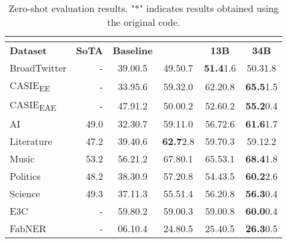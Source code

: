 \documentclass{article} \usepackage{iclr2024_conference,times}
\newcommand{\GoLLIE}{\scalerel*{\texttt{[image: logo/GoLLIE.pdf]}}{\textrm{\textbigcircle}} }
\begin{document}
\begin{table}
    \centering
    \caption{Zero-shot evaluation results. "*" indicates results obtained using the original code.}
\begin{tabular}{l|r|cc|cc}
            \multicolumn{6}{c}{} \\
            \toprule
            \textbf{Dataset} & \textbf{SoTA} & \textbf{Baseline} & \textbf{\GoLLIE} & \textbf{\GoLLIE 13B} & \textbf{\GoLLIE 34B} \\
            \midrule
            BroadTwitter & - & 39.0\tiny{0.5} & 49.5\tiny{0.7} & \textbf{51.4}\tiny{1.6} & 50.3\tiny{1.8} \\
            
            CASIE\textsubscript{EE} & - & 33.9\tiny{5.6} & 59.3\tiny{2.0} & 62.2\tiny{0.8} & \textbf{65.5}\tiny{1.5} \\
            
            CASIE\textsubscript{EAE} & -& 47.9\tiny{1.2} & 50.0\tiny{0.2} & 52.6\tiny{0.2} & \textbf{55.2}\tiny{0.4} \\
            
            AI & \citep{DBLP:journals/corr/abs-2304-08085} 49.0 & 32.3\tiny{0.7} & 59.1\tiny{1.0} & 56.7\tiny{2.6} & \textbf{61.6}\tiny{1.7} \\
            
            Literature & \citep{DBLP:journals/corr/abs-2304-08085} 47.2 & 39.4\tiny{0.6} & \textbf{62.7}\tiny{2.8} & 59.7\tiny{0.3} & 59.1\tiny{2.2} \\
            
            Music & \citep{DBLP:journals/corr/abs-2304-08085} 53.2 & 56.2\tiny{1.2} & 67.8\tiny{0.1} & 65.5\tiny{3.1} & \textbf{68.4}\tiny{1.8} \\
            
            Politics & \citep{DBLP:journals/corr/abs-2304-08085} 48.2 & 38.3\tiny{0.9} & 57.2\tiny{0.8} & 54.4\tiny{3.5} & \textbf{60.2}\tiny{2.6} \\
            
            Science & \citep{DBLP:journals/corr/abs-2304-08085} 49.3 & 37.1\tiny{1.3} & 55.5\tiny{1.4} & 56.2\tiny{0.8} & \textbf{56.3}\tiny{0.4} \\
            
            E3C & - & 59.8\tiny{0.2} & 59.0\tiny{0.3} & 59.0\tiny{0.8} & \textbf{60.0}\tiny{0.4} \\
            
            FabNER & - & 06.1\tiny{0.4} & 24.8\tiny{0.5} & 25.4\tiny{0.5} & \textbf{26.3}\tiny{0.5} \\
            

\end{tabular}
\end{table}
\end{document}
